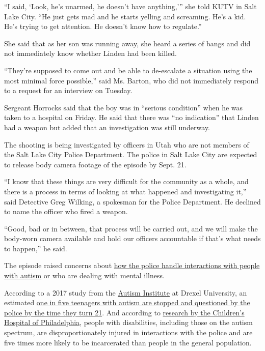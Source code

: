 ``I said, `Look, he's unarmed, he doesn't have anything,''' she told
KUTV in Salt Lake City. ``He just gets mad and he starts yelling and
screaming. He's a kid. He's trying to get attention. He doesn't know how
to regulate.''

She said that as her son was running away, she heard a series of bangs
and did not immediately know whether Linden had been killed.

``They're supposed to come out and be able to de-escalate a situation
using the most minimal force possible,'' said Ms. Barton, who did not
immediately respond to a request for an interview on Tuesday.

Sergeant Horrocks said that the boy was in ``serious condition'' when he
was taken to a hospital on Friday. He said that there was ``no
indication'' that Linden had a weapon but added that an investigation
was still underway.

The shooting is being investigated by officers in Utah who are not
members of the Salt Lake City Police Department. The police in Salt Lake
City are expected to release body camera footage of the episode by Sept.
21.

``I know that these things are very difficult for the community as a
whole, and there is a process in terms of looking at what happened and
investigating it,'' said Detective Greg Wilking, a spokesman for the
Police Department. He declined to name the officer who fired a weapon.

``Good, bad or in between, that process will be carried out, and we will
make the body-worn camera available and hold our officers accountable if
that's what needs to happen,'' he said.

The episode raised concerns about
\href{https://www.nytimes3xbfgragh.onion/2020/02/27/well/family/autism-special-needs-police.html}{how
the police handle interactions with people with autism} or who are
dealing with mental illness.

According to a 2017 study from the
\href{https://drexel.edu/AutismInstitute/}{Autism Institute} at Drexel
University, an estimated
\href{https://www.ncbi.nlm.nih.gov/pubmed/27844248}{one in five
teenagers with autism are stopped and questioned by the police by the
time they turn 21}. And according to
\href{https://www.chop.edu/news/chop-researchers-present-new-findings-2019-international-society-autism-research-annual-meeting}{research
by the Children's Hospital of Philadelphia}, people with disabilities,
including those on the autism spectrum, are disproportionately injured
in interactions with the police and are five times more likely to be
incarcerated than people in the general population.

